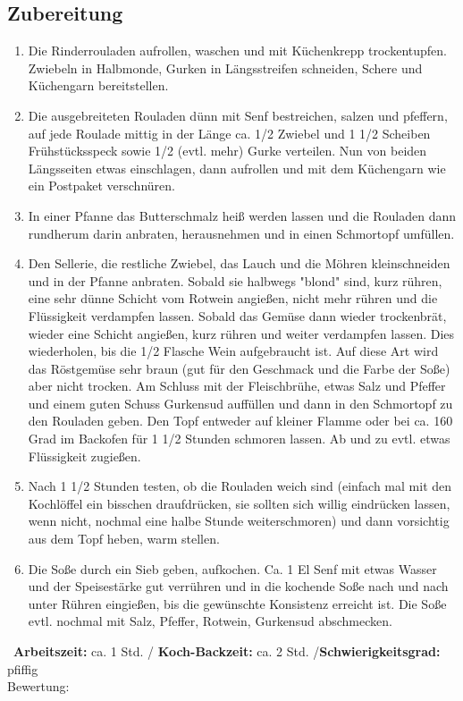\begin{minipage}[t]{0.58\textwidth}
\vspace{0pt}
\subsection*{Zubereitung}
\begin{enumerate}[leftmargin=*, itemindent=14pt]
\item Die Rinderrouladen aufrollen, waschen und mit Küchenkrepp trockentupfen. Zwiebeln in Halbmonde, Gurken in Längsstreifen schneiden, Schere und Küchengarn bereitstellen. 

\item Die ausgebreiteten Rouladen dünn mit Senf bestreichen, salzen und pfeffern, auf jede Roulade mittig in der Länge ca. 1/2 Zwiebel und 1 1/2 Scheiben Frühstücksspeck sowie 1/2 (evtl. mehr) Gurke verteilen. Nun von beiden Längsseiten etwas einschlagen, dann aufrollen und mit dem Küchengarn wie ein Postpaket verschnüren.

\item In einer Pfanne das Butterschmalz heiß werden lassen und die Rouladen dann rundherum darin anbraten, herausnehmen und in einen Schmortopf umfüllen.

\item Den Sellerie, die restliche Zwiebel, das Lauch und die Möhren kleinschneiden und in der Pfanne anbraten. Sobald sie halbwegs "blond" sind, kurz rühren, eine sehr dünne Schicht vom Rotwein angießen, nicht mehr rühren und die Flüssigkeit verdampfen lassen. Sobald das Gemüse dann wieder trockenbrät, wieder eine Schicht angießen, kurz rühren und weiter verdampfen lassen. Dies wiederholen, bis die 1/2 Flasche Wein aufgebraucht ist. Auf diese Art wird das Röstgemüse sehr braun (gut für den Geschmack und die Farbe der Soße) aber nicht trocken. Am Schluss mit der Fleischbrühe, etwas Salz und Pfeffer und einem guten Schuss Gurkensud auffüllen und dann in den Schmortopf zu den Rouladen geben. Den Topf entweder auf kleiner Flamme oder bei ca. 160 Grad im Backofen für 1 1/2 Stunden schmoren lassen. Ab und zu evtl. etwas Flüssigkeit zugießen.

\item Nach 1 1/2 Stunden testen, ob die Rouladen weich sind (einfach mal mit den Kochlöffel ein bisschen draufdrücken, sie sollten sich willig eindrücken lassen, wenn nicht, nochmal eine halbe Stunde weiterschmoren) und dann vorsichtig aus dem Topf heben, warm stellen.

\item Die Soße durch ein Sieb geben, aufkochen. Ca. 1 El Senf mit etwas Wasser und der Speisestärke gut verrühren und in die kochende Soße nach und nach unter Rühren eingießen, bis die gewünschte Konsistenz erreicht ist. Die Soße evtl. nochmal mit Salz, Pfeffer, Rotwein, Gurkensud abschmecken. 

\end{enumerate}
\end{minipage}
\vfill
\decothreeright \, \textbf{Arbeitszeit:} ca. 1 Std. / \textbf{Koch-Backzeit:} ca. 2 Std. /\textbf{Schwierigkeitsgrad:} pfiffig \decothreeleft \hfill \\ Bewertung:  \Circle  \Circle \Circle \Circle \Circle